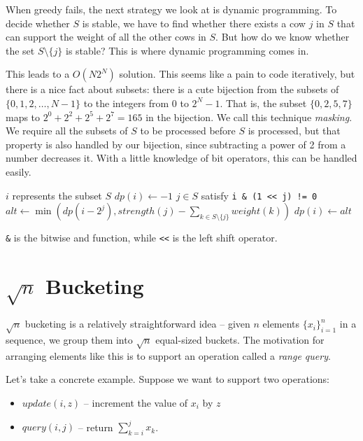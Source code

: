 When greedy fails, the next strategy we look at is dynamic programming. To decide whether $S$ is stable, we have to find whether there exists a cow $j$ in $S$ that can support the weight of all the other cows in $S$. But how do we know whether the set $S \setminus \{j\}$ is stable? This is where dynamic programming comes in.

This leads to a $O(N 2^N)$ solution. This seems like a pain to code iteratively, but there is a nice fact about subsets: there is a cute bijection from the subsets of $\{0,1,2, \ldots, N-1\}$ to the integers from 0 to $2^N - 1$. That is, the subset $\{0,2,5,7\}$ maps to $2^0 + 2^2 + 2^5 + 2^7 = 165$ in the bijection. We call this technique \textit{masking}. We require all the subsets of $S$ to be processed before $S$ is processed, but that property is also handled by our bijection, since subtracting a power of 2 from a number decreases it. With a little knowledge of bit operators, this can be handled easily.

\noindent \begin{minipage}{\textwidth}
\begin{algorithmic}
	\Comment $i$ represents the subset $S$
	\State $dp(i) \gets -1$
		\Comment $j \in S$ satisfy \texttt{i \& (1 << j) != 0}
		\State $alt \gets \min(dp(i-2^j), strength(j) - \sum_{k \in S \setminus \{j\}} weight(k))$
			\State $dp(i) \gets alt$
		\EndIf
	\EndFor
\EndFor
\end{algorithmic}
\end{minipage}

\texttt{\&} is the bitwise and function, while \texttt{<<} is the left shift operator.

\section{$\sqrt{n}$ Bucketing}

$\sqrt{n}$ bucketing is a relatively straightforward idea -- given $n$ elements $\{x_i\}_{i=1}^n$ in a sequence, we group them into $\sqrt{n}$ equal-sized buckets. The motivation for arranging elements like this is to support an operation called a \textit{range query}.

Let's take a concrete example. Suppose we want to support two operations:

\begin{itemize}
\item
$update(i, z)$ -- increment the value of $x_i$ by $z$

\item
$query(i, j)$ -- return $\sum_{k=i}^j x_k$.
\end{itemize}


